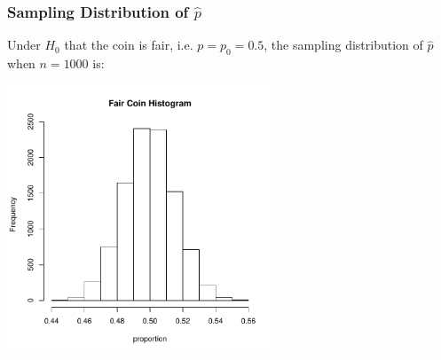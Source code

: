 \documentclass[slides]{beamer}
\newcommand{\blue}[1]{\textcolor{blue2}{#1}}
\begin{document}
%
%
%
%
\begin{frame}
\frametitle{Sampling Distribution of $\widehat{p}$}
\blue{Under $H_0$ that the coin is fair}, i.e. $p=p_0=0.5$, the sampling distribution of $\widehat{p}$ when $n=1000$ is:

\begin{center}
\includegraphics[width=0.6\textwidth]{figure/hist1}
\end{center}
\end{frame}
\end{document}
